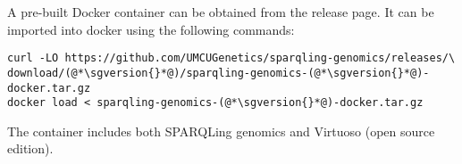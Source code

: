   A pre-built Docker container can be obtained from the release page.  It
  can be imported into docker using the following commands:

\begin{siderules}
\begin{lstlisting}
curl -LO https://github.com/UMCUGenetics/sparqling-genomics/releases/\
download/(@*\sgversion{}*@)/sparqling-genomics-(@*\sgversion{}*@)-docker.tar.gz
docker load < sparqling-genomics-(@*\sgversion{}*@)-docker.tar.gz
\end{lstlisting}
\end{siderules}

  The container includes both SPARQLing genomics and Virtuoso (open source
  edition).
